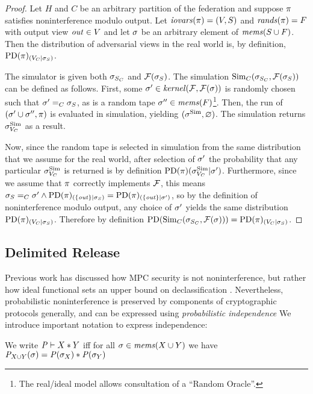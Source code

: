 \begin{proof}
  Let $H$ and $C$ be an arbitrary partition of the federation and
  suppose $\pi$ satisfies noninterference modulo output. Let
  $\mathit{iovars}(\pi) = (V,S)$ and $\mathit{rands}(\pi) = F$ with output view $\mathit{out}
  \in V$ and let $\sigma$ be an arbitrary element of $\mathit{mems}(S \cup
  F)$. Then the distribution of adversarial views in the real world
  is, by definition,
  $\mathrm{PD}(\pi)_{({V_C}|{\sigma_S})}$.

  The simulator is given both $\sigma_{S_C}$ and
  $\mathcal{F}(\sigma_S)$.  The simulation $\mathrm{Sim}_C(\sigma_{S_C},
  \mathcal{F}(\sigma_S))$ can be defined as follows. First, some $\sigma'
  \in \mathit{kernel}(\mathcal{F},\mathcal{F}(\sigma))$ is randomly chosen such that
  $\sigma' =_C \sigma_S$, as is a random tape $\sigma'' \in
  \mathit{mems}(F)$\footnote{The real/ideal model allows consultation of a
  ``Random Oracle''.}. Then, the run of $(\sigma' \cup \sigma'',
  \pi)$ is evaluated in simulation, yielding $(\sigma^{\mathrm{Sim}},\varnothing)$.
  The simulation returns $\sigma^{\mathrm{Sim}}_{V_C}$ as a result.

  Now, since the random tape is selected in simulation from the same distribution
  that we assume for the real world, after selection of $\sigma'$ the
  probability that any particular $\sigma^{\mathrm{Sim}}_{V_C}$ is returned is by definition
  $
  \mathrm{PD}(\pi)(\sigma^{\mathrm{Sim}}_{V_C} | \sigma')
  $.
  Furthermore, since we assume that $\pi$ correctly implements $\mathcal{F}$, this
  means
  $
  \sigma_S =_C \sigma' \wedge
     \mathrm{PD}(\pi)_{({\{ \mathit{out} \}}|{\sigma_S})} =
     \mathrm{PD}(\pi)_{({\{ \mathit{out} \}}|{\sigma'})}
  $,
  so by the definition of noninterference modulo output,
  any choice of $\sigma'$ yields the same distribution $\mathrm{PD}(\pi)_{({V_C}|{\sigma_S})}$.
  Therefore by definition
  $
   \mathrm{PD}(\mathrm{Sim}_C(\sigma_{S_C},\mathcal{F}(\sigma))) = \mathrm{PD}(\pi)_{({V_C}|{\sigma_S})}
  $.
\end{proof}

\subsection{Delimited Release}

Previous work has discussed how MPC security is not noninterference,
but rather how ideal functional sets an upper bound on
declassification \cite{6266151,almeida2018enforcing}. Nevertheless,
probabilistic noninterference is preserved by components of
cryptographic protocols generally, and can be expressed using
\emph{probabilistic independence} \cite{darais2019language,barthe2019probabilistic}
We introduce important notation to express independence:
\begin{definition}
  We write $\mathit{P} \vdash X * Y$ iff for all
    $\sigma \in \mathit{mems}(X \cup Y)$ we have
  ${\mathit{P}}_{X \cup Y}(\sigma) =
  \mathit{P}(\sigma_X) * \mathit{P}(\sigma_Y)$
\end{definition}

